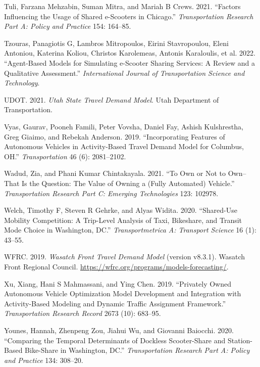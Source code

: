 \documentclass[12pt, oneside, openright]{byuthesis}
\newlength{\cslhangindent}
\newlength{\cslentryspacingunit} %
\newenvironment{CSLReferences}[2] %
 {%
  \setlength{\parindent}{0pt}
  \ifodd #1
  \let\oldpar\par
  \def\par{\hangindent=\cslhangindent\oldpar}
  \fi
  \setlength{\parskip}{#2\cslentryspacingunit}
 }%
 {}
\begin{document}
\begin{CSLReferences}{1}{0}
\leavevmode{}%
Tuli, Farzana Mehzabin, Suman Mitra, and Mariah B Crews. 2021. {``Factors Influencing the Usage of Shared e-Scooters in Chicago.''} \emph{Transportation Research Part A: Policy and Practice} 154: 164--85.

\leavevmode{}%
Tzouras, Panagiotis G, Lambros Mitropoulos, Eirini Stavropoulou, Eleni Antoniou, Katerina Koliou, Christos Karolemeas, Antonis Karaloulis, et al. 2022. {``Agent-Based Models for Simulating e-Scooter Sharing Services: A Review and a Qualitative Assessment.''} \emph{International Journal of Transportation Science and Technology}.

\leavevmode{}%
UDOT. 2021. \emph{Utah State Travel Demand Model}. Utah Department of Transportation.

\leavevmode{}%
Vyas, Gaurav, Pooneh Famili, Peter Vovsha, Daniel Fay, Ashish Kulshrestha, Greg Giaimo, and Rebekah Anderson. 2019. {``Incorporating Features of Autonomous Vehicles in Activity-Based Travel Demand Model for Columbus, OH.''} \emph{Transportation} 46 (6): 2081--2102.

\leavevmode{}%
Wadud, Zia, and Phani Kumar Chintakayala. 2021. {``To Own or Not to Own--That Is the Question: The Value of Owning a (Fully Automated) Vehicle.''} \emph{Transportation Research Part C: Emerging Technologies} 123: 102978.

\leavevmode{}%
Welch, Timothy F, Steven R Gehrke, and Alyas Widita. 2020. {``Shared-Use Mobility Competition: A Trip-Level Analysis of Taxi, Bikeshare, and Transit Mode Choice in Washington, DC.''} \emph{Transportmetrica A: Transport Science} 16 (1): 43--55.

\leavevmode{}%
WFRC. 2019. \emph{Wasatch Front Travel Demand Model} (version v8.3.1). Wasatch Front Regional Council. \url{https://wfrc.org/programs/models-forecasting/}.

\leavevmode{}%
Xu, Xiang, Hani S Mahmassani, and Ying Chen. 2019. {``Privately Owned Autonomous Vehicle Optimization Model Development and Integration with Activity-Based Modeling and Dynamic Traffic Assignment Framework.''} \emph{Transportation Research Record} 2673 (10): 683--95.

\leavevmode{}%
Younes, Hannah, Zhenpeng Zou, Jiahui Wu, and Giovanni Baiocchi. 2020. {``Comparing the Temporal Determinants of Dockless Scooter-Share and Station-Based Bike-Share in Washington, DC.''} \emph{Transportation Research Part A: Policy and Practice} 134: 308--20.


\end{CSLReferences}
\end{document}
